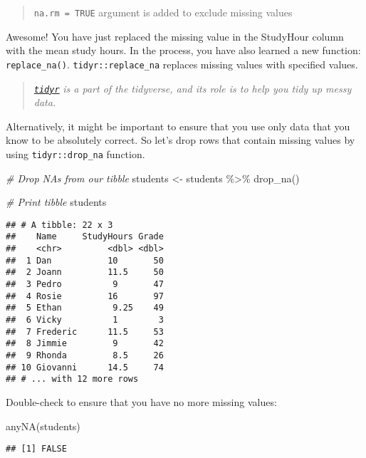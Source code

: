 \documentclass[
]{article}
\newenvironment{Shaded}{\begin{snugshade}}{\end{snugshade}}
\newcommand{\CommentTok}[1]{\textcolor[rgb]{0.56,0.35,0.01}{\textit{#1}}}
\newcommand{\FunctionTok}[1]{\textcolor[rgb]{0.00,0.00,0.00}{#1}}
\newcommand{\NormalTok}[1]{#1}
\newcommand{\OtherTok}[1]{\textcolor[rgb]{0.56,0.35,0.01}{#1}}
\newcommand{\SpecialCharTok}[1]{\textcolor[rgb]{0.00,0.00,0.00}{#1}}
\begin{document}
\begin{quote}
\texttt{na.rm\ =\ TRUE} argument is added to exclude missing values
\end{quote}

Awesome! You have just replaced the missing value in the StudyHour
column with the mean study hours. In the process, you have also learned
a new function: \texttt{replace\_na()}. \texttt{tidyr::replace\_na}
replaces missing values with specified values.

\begin{quote}
\href{https://tidyr.tidyverse.org/index.html}{\emph{\texttt{tidyr}}}
\emph{is a part of the tidyverse, and its role is to help you tidy up
messy data.}
\end{quote}

Alternatively, it might be important to ensure that you use only data
that you know to be absolutely correct. So let's drop rows that contain
missing values by using \texttt{tidyr::drop\_na} function.

\begin{Shaded}
\begin{Highlighting}[]
\CommentTok{\# Drop NAs from our tibble}
\NormalTok{students }\OtherTok{\textless{}{-}}\NormalTok{ students }\SpecialCharTok{\%\textgreater{}\%} 
  \FunctionTok{drop\_na}\NormalTok{()}

\CommentTok{\# Print tibble}
\NormalTok{students}
\end{Highlighting}
\end{Shaded}

\begin{verbatim}
## # A tibble: 22 x 3
##    Name     StudyHours Grade
##    <chr>         <dbl> <dbl>
##  1 Dan           10       50
##  2 Joann         11.5     50
##  3 Pedro          9       47
##  4 Rosie         16       97
##  5 Ethan          9.25    49
##  6 Vicky          1        3
##  7 Frederic      11.5     53
##  8 Jimmie         9       42
##  9 Rhonda         8.5     26
## 10 Giovanni      14.5     74
## # ... with 12 more rows
\end{verbatim}

Double-check to ensure that you have no more missing values:

\begin{Shaded}
\begin{Highlighting}[]
\FunctionTok{anyNA}\NormalTok{(students)}
\end{Highlighting}
\end{Shaded}

\begin{verbatim}
## [1] FALSE
\end{verbatim}
\end{document}
